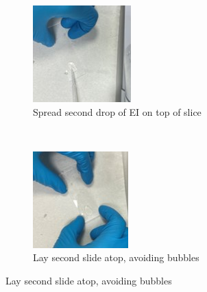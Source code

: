 \begin{figure}[H]
\medskip 
\begin{subfigure}{.4\linewidth}
  \includegraphics[width=\linewidth]{Images/Step3.jpg}
  \caption{Spread second drop of EI on top of slice}
  \label{velcomp}
\end{subfigure}\hfill 
~
\begin{subfigure}{.4\linewidth}
  \includegraphics[width=\linewidth]{Images/Step4.jpg}
  \caption{Lay second slide atop, avoiding bubbles}
  \label{estcomp}
\end{subfigure}\hfill 

\end{figure}

